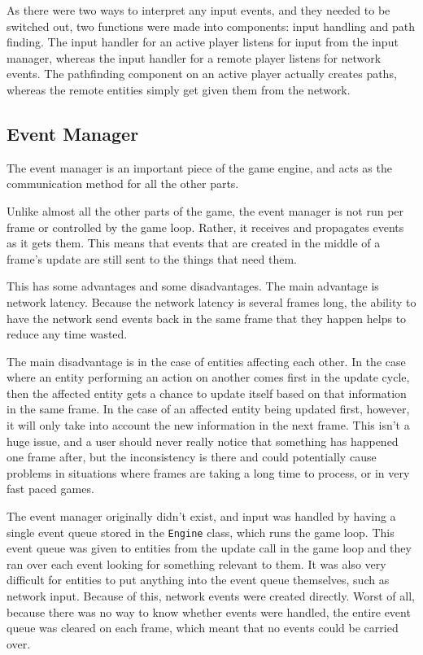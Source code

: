 As there were two ways to interpret any input events, and they needed to be switched out, two functions were made into components: input handling and path finding. The input handler for an active player listens for input from the input manager, whereas the input handler for a remote player listens for network events. The pathfinding component on an active player actually creates paths, whereas the remote entities simply get given them from the network.

\subsection{Event Manager}
The event manager is an important piece of the game engine, and acts as the communication method for all the other parts.

Unlike almost all the other parts of the game, the event manager is not run per frame or controlled by the game loop. Rather, it receives and propagates events as it gets them. This means that events that are created in the middle of a frame's update are still sent to the things that need them.

This has some advantages and some disadvantages. The main advantage is network latency. Because the network latency is several frames long, the ability to have the network send events back in the same frame that they happen helps to reduce any time wasted.

The main disadvantage is in the case of entities affecting each other. In the case where an entity performing an action on another comes first in the update cycle, then the affected entity gets a chance to update itself based on that information in the same frame. In the case of an affected entity being updated first, however, it will only take into account the new information in the next frame. This isn't a huge issue, and a user should never really notice that something has happened one frame after, but the inconsistency is there and could potentially cause problems in situations where frames are taking a long time to process, or in very fast paced games.

The event manager originally didn't exist, and input was handled by having a single event queue stored in the \texttt{Engine} class, which runs the game loop. This event queue was given to entities from the update call in the game loop and they ran over each event looking for something relevant to them. It was also very difficult for entities to put anything into the event queue themselves, such as network input. Because of this, network events were created directly. Worst of all, because there was no way to know whether events were handled, the entire event queue was cleared on each frame, which meant that no events could be carried over.

